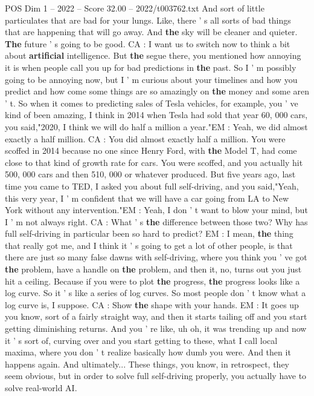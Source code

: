 \begin{textsample}{POS Dim 1 – 2022 – Score 32.00 – 2022/t003762.txt}
And sort of little particulates that are bad for your lungs.
Like, there ' s all sorts of bad things that are happening that will go away.
And \textbf{the} sky will be cleaner and quieter. \textbf{The} future ' s going to be good.
CA : I want us to switch now to think a bit about \textbf{artificial} intelligence.
But \textbf{the} segue there, you mentioned how annoying it is when people call you up for bad predictions in \textbf{the} past.
So I ' m possibly going to be annoying now, but I ' m curious about your timelines and how you predict and how come some things are so amazingly on \textbf{the} money and some aren ' t.
So when it comes to predicting sales of Tesla vehicles, for example, you ' ve kind of been amazing, I think in 2014 when Tesla had sold that year 60, 000 cars, you said,"2020, I think we will do half a million a year."EM : Yeah, we did almost exactly a half million.
CA : You did almost exactly half a million.
You were scoffed in 2014 because no one since Henry Ford, with \textbf{the} Model T, had come close to that kind of growth rate for cars.
You were scoffed, and you actually hit 500, 000 cars and then 510, 000 or whatever produced.
But five years ago, last time you came to TED, I asked you about full self-driving, and you said,"Yeah, this very year, I ' m confident that we will have a car going from LA to New York without any intervention."EM : Yeah, I don ' t want to blow your mind, but I ' m not always right.
CA : What ' s \textbf{the} difference between those two?
Why has full self-driving in particular been so hard to predict?
EM : I mean, \textbf{the} thing that really got me, and I think it ' s going to get a lot of other people, is that there are just so many false dawns with self-driving, where you think you ' ve got \textbf{the} problem, have a handle on \textbf{the} problem, and then it, no, turns out you just hit a ceiling.
Because if you were to plot \textbf{the} progress, \textbf{the} progress looks like a log curve.
So it ' s like a series of log curves.
So most people don ' t know what a log curve is, I suppose.
CA : Show \textbf{the} shape with your hands.
EM : It goes up you know, sort of a fairly straight way, and then it starts tailing off and you start getting diminishing returns.
And you ' re like, uh oh, it was trending up and now it ' s sort of, curving over and you start getting to these, what I call local maxima, where you don ' t realize basically how dumb you were.
And then it happens again.
And ultimately...
These things, you know, in retrospect, they seem obvious, but in order to solve full self-driving properly, you actually have to solve real-world AI.

\end{textsample}
